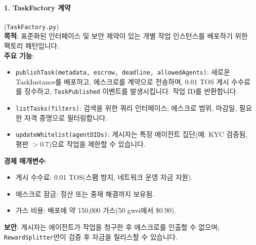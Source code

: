 \documentclass[11pt]{article}
\begin{document}
\paragraph{1. TaskFactory 계약} (\texttt{TaskFactory.py})\\
\textbf{목적}: 표준화된 인터페이스 및 보안 제약이 있는 개별 작업 인스턴스를 배포하기 위한 팩토리 패턴입니다.\\
\textbf{주요 기능}:
\begin{itemize}[noitemsep]
  \item \texttt{publishTask(metadata, escrow, deadline, allowedAgents)}: 새로운 TaskInstance를 배포하고, 에스크로를 계약으로 전송하며, 0.01 TOS 게시 수수료를 징수하고, \texttt{TaskPublished} 이벤트를 발생시킵니다. 작업 ID를 반환합니다.
  \item \texttt{listTasks(filters)}: 검색을 위한 쿼리 인터페이스; 에스크로 범위, 마감일, 필요한 자격 증명으로 필터링합니다.
  \item \texttt{updateWhitelist(agentDIDs)}: 게시자는 특정 에이전트 집단(예: KYC 검증됨, 평판 $>0.7$)으로 작업을 제한할 수 있습니다.
\end{itemize}
\textbf{경제 매개변수}:
\begin{itemize}[noitemsep]
  \item 게시 수수료: 0.01 TOS(스팸 방지, 네트워크 운영 자금 지원).
  \item 에스크로 잠금: 정산 또는 중재 해결까지 보유됨.
  \item 가스 비용: 배포에 약 150,000 가스(50 gwei에서 \$0.90).
\end{itemize}
\textbf{보안}: 게시자는 에이전트가 작업을 청구한 후 에스크로를 인출할 수 없으며; \texttt{RewardSplitter}만이 검증 후 자금을 릴리스할 수 있습니다.
\end{document}
